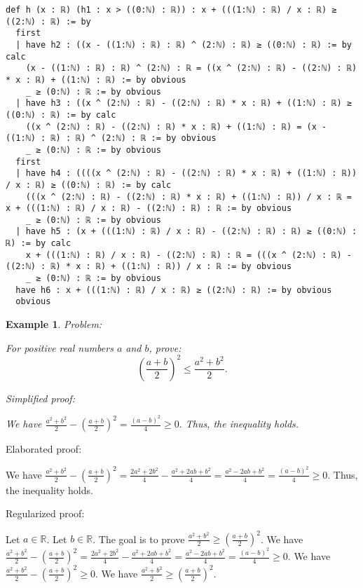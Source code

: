 \documentclass{article}
\newtheorem{example}{Example}
\begin{document}
\begin{tcolorbox}[colback=white!10, width=\linewidth]
\begin{lstlisting}[language=Lean4]
def h (x : ℝ) (h1 : x > ((0:ℕ) : ℝ)) : x + (((1:ℕ) : ℝ) / x : ℝ) ≥ ((2:ℕ) : ℝ) := by
  first
  | have h2 : ((x - ((1:ℕ) : ℝ) : ℝ) ^ (2:ℕ) : ℝ) ≥ ((0:ℕ) : ℝ) := by calc
    (x - ((1:ℕ) : ℝ) : ℝ) ^ (2:ℕ) : ℝ = ((x ^ (2:ℕ) : ℝ) - ((2:ℕ) : ℝ) * x : ℝ) + ((1:ℕ) : ℝ) := by obvious
    _ ≥ (0:ℕ) : ℝ := by obvious
  | have h3 : ((x ^ (2:ℕ) : ℝ) - ((2:ℕ) : ℝ) * x : ℝ) + ((1:ℕ) : ℝ) ≥ ((0:ℕ) : ℝ) := by calc
    ((x ^ (2:ℕ) : ℝ) - ((2:ℕ) : ℝ) * x : ℝ) + ((1:ℕ) : ℝ) = (x - ((1:ℕ) : ℝ) : ℝ) ^ (2:ℕ) : ℝ := by obvious
    _ ≥ (0:ℕ) : ℝ := by obvious
  first
  | have h4 : ((((x ^ (2:ℕ) : ℝ) - ((2:ℕ) : ℝ) * x : ℝ) + ((1:ℕ) : ℝ)) / x : ℝ) ≥ ((0:ℕ) : ℝ) := by calc
    (((x ^ (2:ℕ) : ℝ) - ((2:ℕ) : ℝ) * x : ℝ) + ((1:ℕ) : ℝ)) / x : ℝ = x + (((1:ℕ) : ℝ) / x : ℝ) - ((2:ℕ) : ℝ) : ℝ := by obvious
    _ ≥ (0:ℕ) : ℝ := by obvious
  | have h5 : (x + (((1:ℕ) : ℝ) / x : ℝ) - ((2:ℕ) : ℝ) : ℝ) ≥ ((0:ℕ) : ℝ) := by calc
    x + (((1:ℕ) : ℝ) / x : ℝ) - ((2:ℕ) : ℝ) : ℝ = (((x ^ (2:ℕ) : ℝ) - ((2:ℕ) : ℝ) * x : ℝ) + ((1:ℕ) : ℝ)) / x : ℝ := by obvious
    _ ≥ (0:ℕ) : ℝ := by obvious
  have h6 : x + (((1:ℕ) : ℝ) / x : ℝ) ≥ ((2:ℕ) : ℝ) := by obvious
  obvious

\end{lstlisting}
\end{tcolorbox}


\begin{example}
Problem:
\begin{tcolorbox}[colback=yellow!10, width=\linewidth]
For positive real numbers $a$ and $b$, prove:
    $$\left(\frac{a+b}{2}\right)^2 \leq \frac{a^2+b^2}{2}.$$
\end{tcolorbox}

Simplified proof:
\begin{tcolorbox}[colback=blue!10, width=\linewidth]
We have
$ \frac{a^2+b^2}{2} - \left(\frac{a+b}{2}\right)^2 = \frac{(a-b)^2}{4} \ge 0. $
Thus, the inequality holds.
\end{tcolorbox}
\end{example}

Elaborated proof:
\begin{tcolorbox}[colback=green!10, width=\linewidth]
We have
$ \frac{a^2+b^2}{2} - \left(\frac{a+b}{2}\right)^2 = \frac{2a^2+2b^2}{4} - \frac{a^2+2ab+b^2}{4} = \frac{a^2-2ab+b^2}{4} = \frac{(a-b)^2}{4} \ge 0. $
Thus, the inequality holds.
\end{tcolorbox}

Regularized proof:
\begin{tcolorbox}[colback=red!10, width=\linewidth]
Let $a\in\mathbb{R}$.
Let $b\in\mathbb{R}$.
The goal is to prove $\frac{a^2+b^2}{2} \ge {\left(\frac{a+b}{2}\right)}^2$.
We have $\frac{a^2+b^2}{2} - {\left(\frac{a+b}{2}\right)}^2 = \frac{2a^2+2b^2}{4} - \frac{a^2+2ab+b^2}{4} = \frac{a^2-2ab+b^2}{4} = \frac{{{(a-b)}}^2}{4} \ge 0$.
We have $\frac{a^2+b^2}{2} - {\left(\frac{a+b}{2}\right)}^2 \ge 0$.
We have $\frac{a^2+b^2}{2} \ge {\left(\frac{a+b}{2}\right)}^2$.
\end{tcolorbox}
\end{document}
